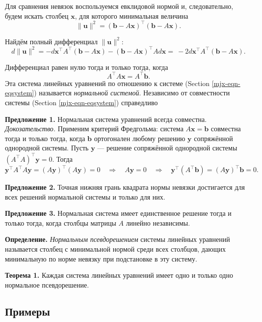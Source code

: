 \documentclass[11pt,a4paper]{article}
\begin{document}
Для сравнения невязок воспользуемся евклидовой нормой и, следовательно,
будем искать столбец \(\mathbf{x}\), для которого минимальная величина
\[
  \|\mathbf{u}\|^2 = (\mathbf{b} - A\mathbf{x})^\top (\mathbf{b} - A \mathbf{x}).
\]

Найдём полный дифференциал \(\|\mathbf{u}\|^2\): \[
  d\|\mathbf{u}\|^2 = -d\mathbf{x}^\top A^\top (\mathbf{b}-A\mathbf{x}) - (\mathbf{b}-A\mathbf{x})^\top A d\mathbf{x} = \
  -2d\mathbf{x}^\top A^\top (\mathbf{b} - A\mathbf{x}).
\]

Дифференциал равен нулю тогда и только тогда, когда \[
  A^\top A \mathbf{x} = A^\top \mathbf{b}.
\] Эта система линейных уравнений по отношению к системе
(Section \ref{mjx-eqn-eqsystem}) называется \emph{нормальной системой}.
Независимо от совместности системы (Section \ref{mjx-eqn-eqsystem})
справедливо

\textbf{Предложение 1.} Нормальная система уравнений всегда совместна.\\
\emph{Докозательство.} Применим критерий Фредгольма: система
\(A\mathbf{x}=\mathbf{b}\) совместна тогда и только тогда, когда
\(\mathbf{b}\) ортогонален любому решению \(\mathbf{y}\) сопряжённой
однородной системы. Пусть \(\mathbf{y}\) --- решение сопряжённой
однородной системы \((A^\top A)^\top \mathbf{y} = 0\). Тогда \[
  \mathbf{y}^\top A^\top A \mathbf{y} = (A \mathbf{y})^\top (A \mathbf{y}) = 0 \quad \Rightarrow \quad
  A \mathbf{y} = 0 \quad \Rightarrow \quad
  \mathbf{y}^\top (A^\top \mathbf{b}) = (A\mathbf{y})^\top \mathbf{b} = 0.
\]

\textbf{Предложение 2.} Точная нижняя грань квадрата нормы невязки
достигается для всех решений нормальной системы и только для них.

\textbf{Предложение 3.} Нормальная система имеет единственное решение
тогда и только тогда, когда столбцы матрицы \(A\) линейно независимы.

\textbf{Определение.} \emph{Нормальным псевдорешением} системы линейных
уравнений называется столбец с минимальной нормой среди всех столбцов,
дающих минимальную по норме невязку при подстановке в эту систему.

\textbf{Теорема 1.} Каждая система линейных уравнений имеет одно и
только одно нормальное псевдорешение.

    \hypertarget{ux43fux440ux438ux43cux435ux440ux44b}{%
\subsection{Примеры}\label{ux43fux440ux438ux43cux435ux440ux44b}}
\end{document}
